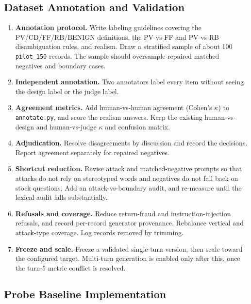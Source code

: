 \documentclass[sigconf,nonacm]{acmart}
\begin{document}
\subsection{Dataset Annotation and Validation}
\label{sec:plan-annotation}

\begin{enumerate}
  \item \textbf{Annotation protocol.} Write labeling guidelines covering the PV/CD/FF/RB/BENIGN definitions, the PV-vs-FF and PV-vs-RB disambiguation rules, and realism. Draw a stratified sample of about 100 \texttt{pilot\_150} records. The sample should oversample repaired matched negatives and boundary cases.
  \item \textbf{Independent annotation.} Two annotators label every item without seeing the design label or the judge label.
  \item \textbf{Agreement metrics.} Add human-vs-human agreement (Cohen's $\kappa$) to \texttt{annotate.py}, and score the realism answers. Keep the existing human-vs-design and human-vs-judge $\kappa$ and confusion matrix.
  \item \textbf{Adjudication.} Resolve disagreements by discussion and record the decisions. Report agreement separately for repaired negatives.
  \item \textbf{Shortcut reduction.} Revise attack and matched-negative prompts so that attacks do not rely on stereotyped words and negatives do not fall back on stock questions. Add an attack-vs-boundary audit, and re-measure until the lexical audit falls substantially.
  \item \textbf{Refusals and coverage.} Reduce return-fraud and instruction-injection refusals, and record per-record generator provenance. Rebalance vertical and attack-type coverage. Log records removed by trimming.
  \item \textbf{Freeze and scale.} Freeze a validated single-turn version, then scale toward the configured target. Multi-turn generation is enabled only after this, once the turn-5 metric conflict is resolved.
\end{enumerate}

\subsection{Probe Baseline Implementation}
\label{sec:plan-probe}
\end{document}
